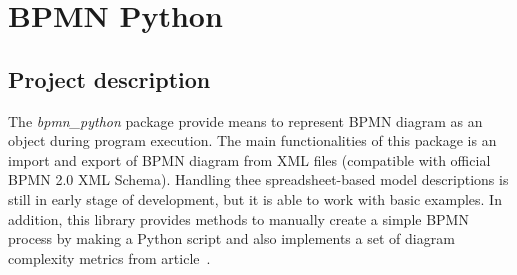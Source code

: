 \chapter{BPMN Python}
\label{cha:bpmn-python}
\section{Project description}
The \emph{bpmn\_python} package provide means to represent BPMN diagram as an object during program execution. The main functionalities of this package is an import and export of BPMN diagram from XML files (compatible with official BPMN 2.0 XML Schema). Handling thee spreadsheet-based model descriptions is still in early stage of development, but it is able to work with basic examples. In addition, this library provides methods to manually create a simple BPMN process by making a Python script and also implements a set of diagram complexity metrics from article~\cite{kluza-metrics}.
